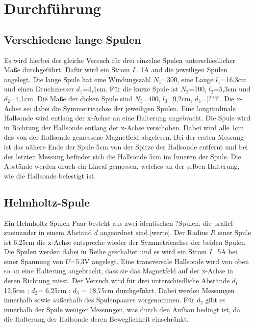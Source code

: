 \section{Durchführung}
\label{sec:Durchführung}

    \subsection{Verschiedene lange Spulen}

        Es wird hierbei der gleiche Versuch für drei einzelne Spulen 
        unterschiedlicher Maße durchgeführt. Dafür wird ein Strom $I$=1\si{\ampere}
        and die jeweiligen Spulen angelegt. Die lange Spule hat eine 
        Windungszahl $N_1$=300, eine Länge $l_1$=16,3\si{\centi\meter} und 
        einen Druchmesser $d_1$=4,1\si{\centi\meter}. Für die kurze Spule ist 
        $N_2$=100, $l_2$=5,3\si{\centi\meter} und $d_2$=4,1\si{\centi\meter}.
        Die Maße der dicken Spule sind $N_3$=400, $l_3$=9,2\si{\centi\meter},
        $d_3$=[???]. Die x-Achse sei dabei die Symmetrieachse 
        der jeweiligen Spulen. Eine longitudinale Hallsonde wird entlang der x-Achse
        an eine Halterung angebracht. Die Spule wird in Richtung der Hallsonde
        entlang der x-Achse verschoben. Dabei wird alle 1\si{\centi\meter} das von 
        der Hallsonde gemessene Magnetfeld abgelesen. Bei der ersten Messung ist das nähere 
        Ende der Spule 5\si{\centi\meter} von der Spitze der Hallsonde entfernt und bei 
        der letzten Messung befindet sich die Hallsonde 5\si{\centi\meter} im Inneren
        der Spule. Die Abstände werden druch ein Lineal gemessen, welches an der selben
        Halterung, wie die Hallsonde befestigt ist.

    \subsection{Helmholtz-Spule}
        
        Ein Helmholtz-Spulen-Paar besteht aus zwei identischen ?Spulen, die prallel zueinander
        in einem Abstand $d$ angeordnet sind.[werte]. Der Radius $R$ einer Spule ist 6,25\si{\centi\meter}
        die x-Achse entspreche wieder der Symmetrieachse der beiden Spulen. Die Spulen werden dabei in
        Reihe geschaltet und es wird ein Strom $I$=5\si{\ampere} bei einer Spannung von $U$=5,3\si{\volt}
        angelegt. Eine transversale Hallsonde wird von oben so an eine Halterung angebracht, 
        dass sie das Magnetfeld auf 
        der x-Achse in deren Richtung misst. Der Versuch wird für drei unterschiedliche 
        Abstände $d_1$= 12,5\si{\centi\meter} ; $d_2$= 6,25\si{\centi\meter} ; 
        $d_3$ = 18,75\si{\centi\meter} durchgeführt. Dabei werden Messungen innerhalb sowie außerhalb 
        des Spulenpaares vorgenommen. Für $d_2$ gibt es innerhalb der Spule weniger Messungen, was
        durch den Aufbau bedingt ist, da die Halterung der Hallsonde deren Beweglichkeit einschränkt.

